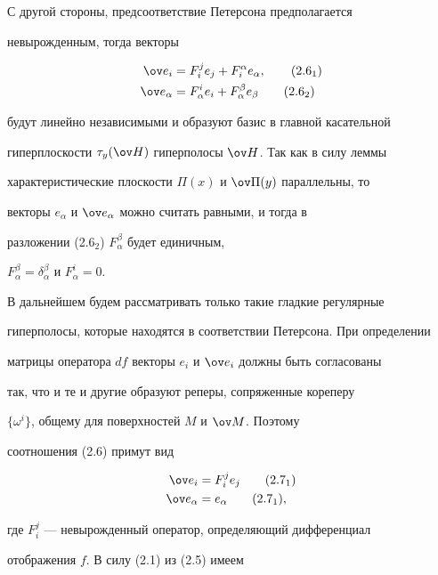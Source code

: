 С другой стороны, предсоответствие Петерсона предполагается 


невырожденным, тогда векторы 


\begin{align} 


\ov e_i&=F^j_i e_j+F^\alpha_i e_\alpha,\tag{2.6${}_1$} \\ 


\ov e_\alpha&=F^i_\alpha e_i+ 


F^\beta_\alpha e_\beta \tag{2.6${}_2$} 


\end{align} 


будут линейно независимыми и образуют базис в главной касательной 


гиперплоскости $\tau_y(\ov H)$ гиперполосы $\ov H$. Так как в силу леммы 


характеристические плоскости $\Pi(x)$ и $\ov\Pi(y)$ параллельны, то 


векторы $e_\alpha$ и $\ov e_\alpha$ можно считать равными, и тогда в 


разложении (2.6${}_2$) $F^\beta_\alpha$ будет единичным, 


$F^\beta_\alpha=\delta^\beta_\alpha$ и $F^i_\alpha=0$. 


 


В дальнейшем будем рассматривать только такие гладкие регулярные 


гиперполосы, которые находятся в соответствии Петерсона. При определении 


матрицы оператора $df$ векторы $e_i$ и $\ov e_i$ должны быть согласованы 


так, что и те и другие образуют реперы, сопряженные кореперу 


$\{\omega^i\}$, общему для поверхностей $M$ и $\ov M$. Поэтому 


соотношения (2.6) примут вид 


\begin{align} 


\ov e_i&=F^j_i e_j \tag{2.7${}_1$} \\ 


\ov e_\alpha&=e_\alpha \tag{2.7${}_1$}, 


\end{align} 


где $F^j_i$ --- невырожденный оператор, определяющий дифференциал 


отображения $f$. В силу (2.1) из (2.5) имеем 


